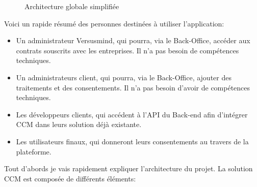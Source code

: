 \documentclass[12pt, a4paper]{report}
\begin{document}
\begin{figure}[H]
\begin{center}
            \end{center}
            \caption{Architecture globale simplifiée}
        \end{figure}
        Voici un rapide résumé des personnes destinées à utiliser l'application:
        \begin{itemize}
            \item Un administrateur Versusmind, qui pourra, via le Back-Office, accéder aux contrats souscrits avec les entreprises. Il n'a pas besoin de compétences techniques.
            \item Un administrateurs client, qui pourra, via le Back-Office, ajouter des traitements et des consentements. Il n'a pas besoin d'avoir de compétences techniques.
            \item Les développeurs clients, qui accédent à l'API du Back-end afin d'intégrer CCM dans leurs solution déjà existante.
            \item Les utilisateurs finaux, qui donneront leurs consentements au travers de la plateforme.
        \end{itemize}
        Tout d'abords je vais rapidement expliquer l'architecture du projet.
        La solution CCM est composée de différents éléments:
\end{document}
